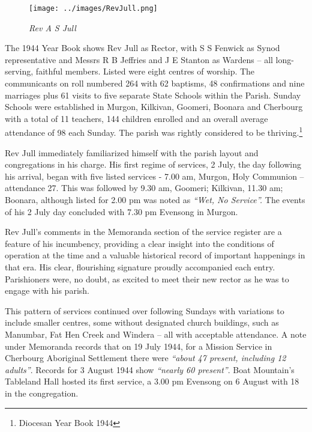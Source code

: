 \begin{figure}
\begin{center}
\texttt{[image: ../images/RevJull.png]}
\caption{\itshape Rev A S Jull}
\end{center}
\end{figure}




The 1944 Year Book shows Rev Jull as Rector, with S S Fenwick as Synod representative and Messrs R B Jeffries and J E Stanton as Wardens -- all long-serving, faithful members. Listed were eight centres of worship. The communicants on roll numbered 264 with 62 baptisms, 48 confirmations and nine marriages plus 61 visits to five separate State Schools within the Parish. Sunday Schools were established in Murgon, Kilkivan, Goomeri, Boonara and Cherbourg with a total of 11 teachers, 144 children enrolled and an overall average attendance of 98 each Sunday. The parish was rightly considered to be thriving.\footnote{Diocesan Year Book 1944}


Rev Jull immediately familiarized himself with the parish layout and congregations in his charge. His first regime of services, 2 July, the day following his arrival, began with five listed services - 7.00 am, Murgon, Holy Communion -- attendance 27. This was followed by 9.30 am, Goomeri; Kilkivan, 11.30 am; Boonara, although listed for 2.00 pm was noted as \emph{``Wet, No Service''.} The events of his 2 July day concluded with 7.30 pm Evensong in Murgon.



Rev Jull's comments in the Memoranda section of the service register are a feature of his incumbency, providing a clear insight into the conditions of operation at the time and a valuable historical record of important happenings in that era. His clear, flourishing signature proudly accompanied each entry. Parishioners were, no doubt, as excited to meet their new rector as he was to engage with his parish.



This pattern of services continued over following Sundays with variations to include smaller centres, some without designated church buildings, such as Manumbar, Fat Hen Creek and Windera -- all with acceptable attendance. A note under Memoranda records that on 19 July 1944, for a Mission Service in Cherbourg Aboriginal Settlement there were \emph{``about 47 present, including 12 adults''}. Records for 3 August 1944 show \emph{``nearly 60 present''}. Boat Mountain's Tableland Hall hosted its first service, a 3.00 pm Evensong on 6 August with 18 in the congregation.



